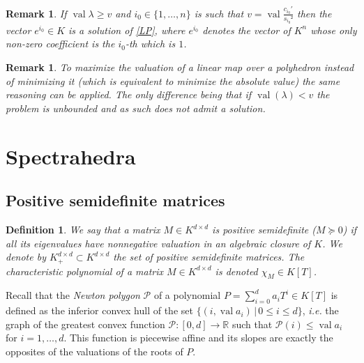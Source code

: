 \documentclass[a4paper,oneside,11pt]{article}
\newtheorem{definition}[theorem]{Definition}
\newtheorem{remark}[theorem]{Remark}
\newcommand{\R}{\mathbb{R}} %
\DeclareMathOperator{\val}{val}
\begin{document}
\begin{remark}
  If $\val \lambda \ge v$ and $i_0 \in \{1,\ldots, n\} $ is such that
  $v = \val \frac{c_{i_0}'}{s_{i_0}²} $ then the vector $e^{i_0} \in K$ is a solution of \ref{LP}, 
  where $e^{i_0}$ denotes the vector of $K^n$ whose only non-zero coefficient is the $i_0$-th
  which is $1$.
\end{remark}

\begin{remark}
  To maximize the valuation of a linear map over a polyhedron instead of minimizing it 
  (which is equivalent to minimize the absolute value) the same reasoning can be applied. 
  The only difference being that if $\val\left( \lambda\right) < v$ the problem is unbounded
  and as such does not admit a solution. 
\end{remark}




\section{Spectrahedra}

\subsection{Positive semidefinite matrices}
\newcommand\Mat{Positive semidefinite matrix }
\newcommand\mats{positive semidefinite matrices }
\newcommand\Mats{positive semidefinite matrices }

\begin{definition}
  We say that a matrix $M \in K^{d \times d}$ is \emph{positive semidefinite} ($M \succeq 0$)
  if all its eigenvalues have nonnegative valuation in an algebraic closure of $K$.
  We denote by $K^{d \times d}_+ \subset K^{d\times d}$ the set of positive semidefinite matrices.
  The characteristic polynomial of a matrix $M \in K^{d\times d}$ is denoted $\chi_M \in K[T]$.
\end{definition}

Recall that the \emph{Newton polygon} $\mathcal{P}$ of a polynomial $P = \sum_{i=0}^{d} a_i T^i \in K[T]$ is
defined as the inferior convex hull of the set $\{(i, \val a_i) \,|\, 0 \le i \le d\}$, {\it i.e.} the
graph of the greatest convex function $\mathcal{P} : [0,d] \to \R$ such that $\mathcal{P}(i) \leq \val a_i$
for $i=1,\ldots,d$. This function is piecewise affine and its slopes are exactly the opposites of the valuations
of the roots of $P$.
\end{document}

